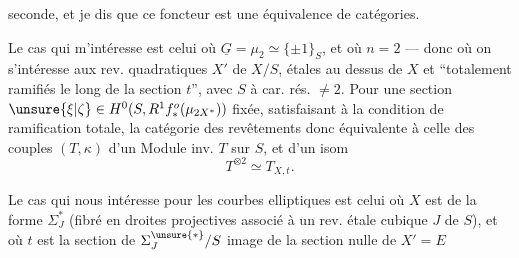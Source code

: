 
seconde, et je dis que ce foncteur est une équivalence de catégories.

Le cas qui m'intéresse est celui où $\underline G=\mu_2\simeq\{\pm1\}_S$, et où $n=2$ --- donc où on s'intéresse aux rev. quadratiques $X'$ de $X/S$, étales au dessus de $X$ et ``totalement ramifiés le long de la section $t$'', avec $S$ à car. rés. $\ne2$.  Pour une section $\unsure{\xi|\zeta}\in H^0(S,R^1f^o_*(\mu_{2X^*}))$ fixée, satisfaisant à la condition de ramification totale, la catégorie des  revêtements  donc équivalente à celle des  couples $(T,\kappa)$ d'un Module inv. $T$ sur $S$, et d'un isom
\[
T^{\otimes2}\simeq T_{X,t}.
\]

Le cas qui nous intéresse pour les courbes elliptiques est celui où $X$ est de la forme $\Sigma_J^*$ (fibré en droites projectives associé à un rev. étale cubique $J$ de $S$),  et où $t$ est la section de $\Sigma_J^{\unsure{*}}/S$  image de la section nulle de $X'=E$ \unsure{\ldots}
